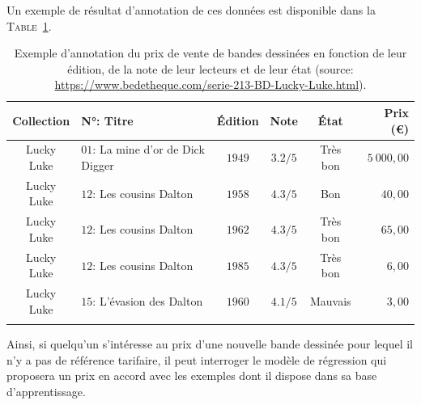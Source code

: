 			Un exemple de résultat d'annotation de ces données est disponible dans la \textsc{Table~\ref{table:2.1.2.A-PRESENTATION-ANNOTATION-EXEMPLES-REGRESSION}}.
			\begin{leftBarExamples}
				\begin{table}[H]  %
					\begin{center}
					\def\arraystretch{0.8}  %
					\begin{tabular}{|c|l|c|c|c|r|}
					
					\hline
					\rowcolor{colorLeftBarExamples!25}
					Collection
						& N°: Titre
						& Édition
						& Note
						& État
						& Prix (€)
						\tabularnewline
						\hline
					Lucky Luke
						& $01$: La mine d'or de Dick Digger
						& $1949$
						& $3.2/5$
						& Très bon
						& $5~000,00$
						\tabularnewline
						\hline
					Lucky Luke
						& $12$: Les cousins Dalton
						& $1958$
						& $4.3/5$
						& Bon
						& $40,00$
						\tabularnewline
						\hline
					Lucky Luke
						& $12$: Les cousins Dalton
						& $1962$
						& $4.3/5$
						& Très bon
						& $65,00$
						\tabularnewline
						\hline
					Lucky Luke
						& $12$: Les cousins Dalton
						& $1985$
						& $4.3/5$
						& Très bon
						& $6,00$
						\tabularnewline
						\hline
					Lucky Luke
						& $15$: L'évasion des Dalton
						& $1960$
						& $4.1/5$
						& Mauvais
						& $3,00$
						\tabularnewline
						\hline
					\multicolumn{6}{|c|}{ \shortstack{ ... } }
						\tabularnewline
						\hline
				
					\end{tabular}
					\end{center}
					\caption{
						Exemple d'annotation du prix de vente de bandes dessinées en fonction de leur édition, de la note de leur lecteurs et de leur état (source: \url{https://www.bedetheque.com/serie-213-BD-Lucky-Luke.html}).
					}
					\label{table:2.1.2.A-PRESENTATION-ANNOTATION-EXEMPLES-REGRESSION}
				\end{table}
			\end{leftBarExamples}
			
			Ainsi, si quelqu'un s'intéresse au prix d'une nouvelle bande dessinée pour lequel il n'y a pas de référence tarifaire, il peut interroger le modèle de régression qui proposera un prix en accord avec les exemples dont il dispose dans sa base d'apprentissage.
			
